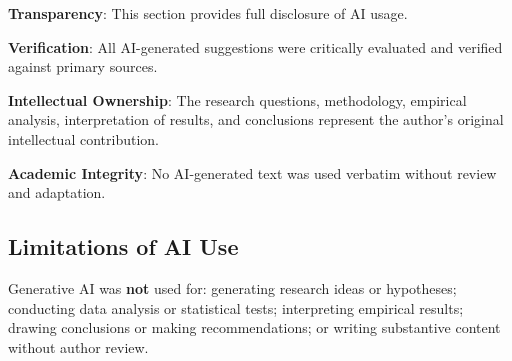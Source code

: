 \documentclass[12pt,a4paper]{article}
\begin{document}
\textbf{Transparency}: This section provides full disclosure of AI usage.

\textbf{Verification}: All AI-generated suggestions were critically evaluated and verified against primary sources.

\textbf{Intellectual Ownership}: The research questions, methodology, empirical analysis, interpretation of results, and conclusions represent the author's original intellectual contribution.

\textbf{Academic Integrity}: No AI-generated text was used verbatim without review and adaptation.

\subsection*{Limitations of AI Use}

Generative AI was \textbf{not} used for: generating research ideas or hypotheses; conducting data analysis or statistical tests; interpreting empirical results; drawing conclusions or making recommendations; or writing substantive content without author review.

\newpage




\end{document}
